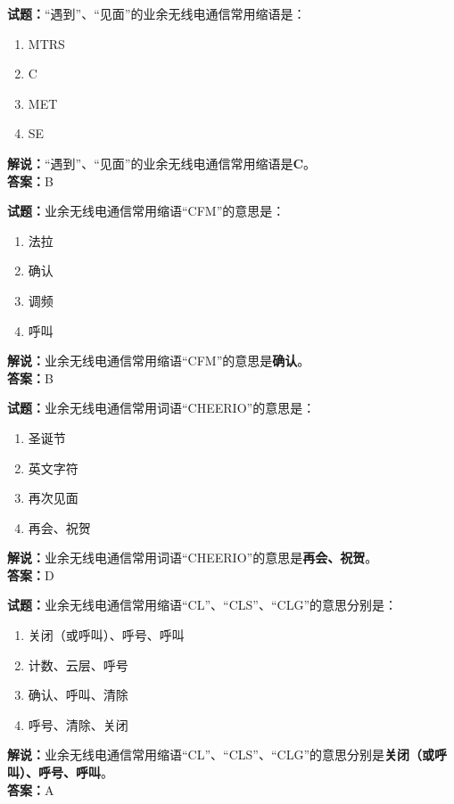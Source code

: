 \documentclass{ctexbook}
\begin{document}
\bigskip


\noindent\textbf{试题：}“遇到”、“见面”的业余无线电通信常用缩语是：
\begin{enumerate}[leftmargin=3em]
\item MTRS
\item C
\item MET
\item SE
\end{enumerate}
\noindent\textbf{解说：}“遇到”、“见面”的业余无线电通信常用缩语是\textbf{C}。\\\noindent\textbf{答案：}B


\bigskip


\noindent\textbf{试题：}业余无线电通信常用缩语“CFM”的意思是：
\begin{enumerate}[leftmargin=3em]
\item 法拉
\item 确认
\item 调频
\item 呼叫
\end{enumerate}
\noindent\textbf{解说：}业余无线电通信常用缩语“CFM”的意思是\textbf{确认}。\\\noindent\textbf{答案：}B

\bigskip


\noindent\textbf{试题：}业余无线电通信常用词语“CHEERIO”的意思是：
\begin{enumerate}[leftmargin=3em]
\item 圣诞节
\item 英文字符
\item 再次见面
\item 再会、祝贺
\end{enumerate}
\noindent\textbf{解说：}业余无线电通信常用词语“CHEERIO”的意思是\textbf{再会、祝贺}。\\\noindent\textbf{答案：}D



\bigskip


\noindent\textbf{试题：}业余无线电通信常用缩语“CL”、“CLS”、“CLG”的意思分别是：
\begin{enumerate}[leftmargin=3em]
\item 关闭（或呼叫）、呼号、呼叫
\item 计数、云层、呼号
\item 确认、呼叫、清除
\item 呼号、清除、关闭
\end{enumerate}
\noindent\textbf{解说：}业余无线电通信常用缩语“CL”、“CLS”、“CLG”的意思分别是\textbf{关闭（或呼叫）、呼号、呼叫}。\\\noindent\textbf{答案：}A
\end{document}

